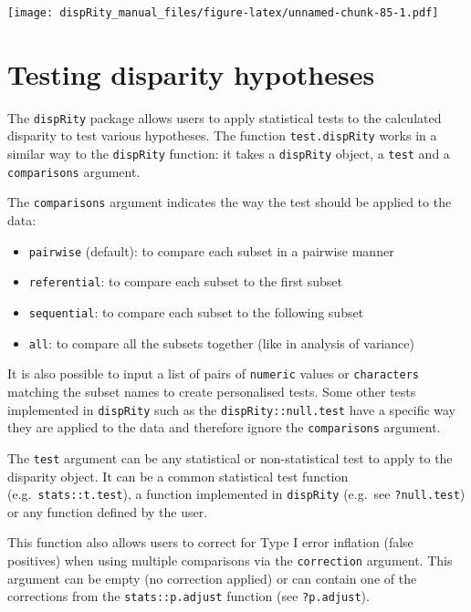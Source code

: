 \documentclass[
]{book}
\providecommand{\tightlist}{%
  \setlength{\itemsep}{0pt}\setlength{\parskip}{0pt}}
\begin{document}
\texttt{[image: dispRity\_manual\_files/figure-latex/unnamed-chunk-85-1.pdf]}

\hypertarget{testing-disparity-hypotheses}{%
\section{Testing disparity hypotheses}\label{testing-disparity-hypotheses}}

The \texttt{dispRity} package allows users to apply statistical tests to the calculated disparity to test various hypotheses.
The function \texttt{test.dispRity} works in a similar way to the \texttt{dispRity} function: it takes a \texttt{dispRity} object, a \texttt{test} and a \texttt{comparisons} argument.

The \texttt{comparisons} argument indicates the way the test should be applied to the data:

\begin{itemize}
\tightlist
\item
  \texttt{pairwise} (default): to compare each subset in a pairwise manner
\item
  \texttt{referential}: to compare each subset to the first subset
\item
  \texttt{sequential}: to compare each subset to the following subset
\item
  \texttt{all}: to compare all the subsets together (like in analysis of variance)
\end{itemize}

It is also possible to input a list of pairs of \texttt{numeric} values or \texttt{characters} matching the subset names to create personalised tests.
Some other tests implemented in \texttt{dispRity} such as the \texttt{dispRity::null.test} have a specific way they are applied to the data and therefore ignore the \texttt{comparisons} argument.

The \texttt{test} argument can be any statistical or non-statistical test to apply to the disparity object.
It can be a common statistical test function (e.g.~\texttt{stats::t.test}), a function implemented in \texttt{dispRity} (e.g.~see \texttt{?null.test}) or any function defined by the user.

This function also allows users to correct for Type I error inflation (false positives) when using multiple comparisons via the \texttt{correction} argument.
This argument can be empty (no correction applied) or can contain one of the corrections from the \texttt{stats::p.adjust} function (see \texttt{?p.adjust}).
\end{document}
